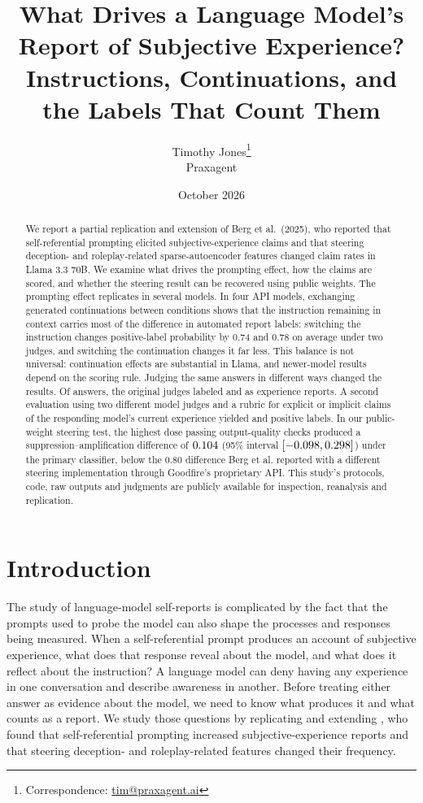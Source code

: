 \documentclass[11pt]{article}
\title{What Drives a Language Model's Report of Subjective Experience?\\[4pt]
\Large Instructions, Continuations, and the Labels That Count Them}
\author{Timothy Jones\thanks{Correspondence: \href{mailto:tim@praxagent.ai}{tim@praxagent.ai}}\\\small Praxagent}
\date{October 2026}
\newcommand{\targetpaper}{\citet{berg2025largelanguagemodelsreport}}
\begin{document}
\maketitle
\begin{abstract}
We report a partial replication and extension of Berg et al.\ (2025), who
reported that self-referential prompting elicited subjective-experience
claims and that steering deception- and roleplay-related sparse-autoencoder
features changed claim rates in Llama 3.3 70B. We examine what drives the
prompting effect, how the claims are scored, and whether the steering result
can be recovered using public weights. The prompting effect replicates in
several models. In four API models, exchanging generated continuations between
conditions shows that the instruction remaining in context carries most of
the difference in automated report labels: switching the instruction changes
positive-label probability by 0.74 and 0.78 on average under two judges, and
switching the continuation changes it far less.
This balance is not universal: continuation effects are substantial in
Llama, and newer-model results depend on the scoring rule.
Judging the same answers in different ways changed the results. Of
\RubricAuditN{} answers, the original judges labeled
\RubricAuditOldOpenaiPositive{} and \RubricAuditOldAnthropicPositive{} as
experience reports. A second evaluation using two different model judges
and a rubric for explicit or implicit claims of the responding model's
current experience yielded \RubricAuditAstraInclusive{} and
\RubricAuditOpusInclusive{} positive labels.
In our public-weight steering test, the highest dose passing
output-quality checks produced a suppression--amplification difference of
$0.104{}$ (95\% interval
$[-0.098{},0.298{}]$) under the primary
classifier, below the 0.80 difference Berg et al. reported with a different
steering implementation through Goodfire's proprietary API.
This study's protocols, code, raw outputs and judgments are publicly
available for inspection, reanalysis and replication.
\end{abstract}

\section{Introduction}
\label{sec:introduction}


The study of language-model self-reports is complicated by the fact that the prompts
used to probe the model can also shape the processes and responses being measured.
When a self-referential prompt produces an account of subjective experience,
what does that response reveal about the model, and what does it
reflect about the instruction? A language model can deny having any experience in one conversation and
describe awareness in another. Before treating either answer as evidence
about the model, we need to know what produces it and what counts as a
report. We study those questions by replicating and extending
\targetpaper{}, who found that self-referential prompting increased
subjective-experience reports and that steering deception- and
roleplay-related features changed their frequency.
\end{document}
